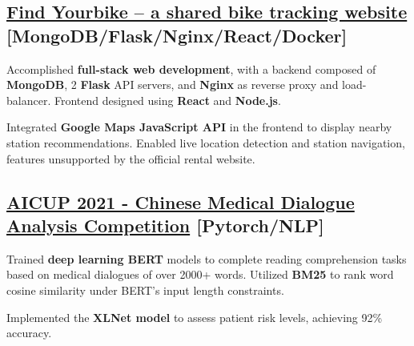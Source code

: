 
% 
%
%
%
%
\subsection{{\href{https://github.com/nba556677go/cloud_computing2020/tree/main/final}{Find Yourbike – a shared bike tracking website} \hfill [MongoDB/Flask/Nginx/React/Docker]}}
\begin{zitemize}
\item Accomplished \textbf{full-stack web development}, with a backend composed of \textbf{MongoDB}, 2 \textbf{Flask} API servers, and \textbf{Nginx} as reverse proxy and load-balancer. Frontend designed using \textbf{React} and \textbf{Node.js}.
\item Integrated \textbf{Google Maps JavaScript API} in the frontend to display nearby station recommendations. Enabled live location detection and station navigation, features unsupported by the official rental website.
\end{zitemize}
\subsection{{\href{https://github.com/mhjuan/AICUP2021-Chinese-Dialogue-Comprehension}{AICUP 2021 - Chinese Medical Dialogue Analysis Competition} \hfill [Pytorch/NLP]}}
\begin{zitemize}
\item Trained \textbf{deep learning BERT} models to complete reading comprehension tasks based on medical dialogues of over 2000+ words. Utilized \textbf{BM25} to rank word cosine similarity under BERT’s input length constraints.
\item Implemented the \textbf{XLNet model} to assess patient risk levels, achieving 92\% accuracy.
\end{zitemize}

